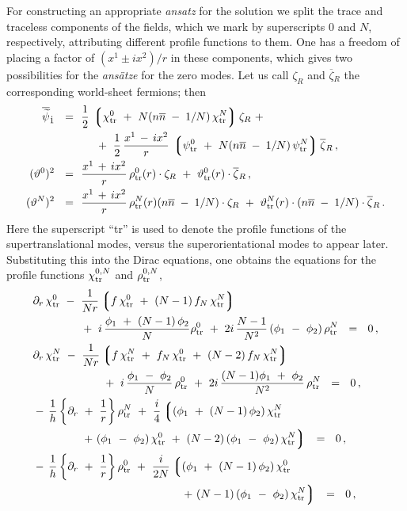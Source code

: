 \documentclass[12pt]{article}
\newcommand{\p}{\partial}
\newcommand{\wt}{\widetilde}
\newcommand{\ov}{\overline}
\newcommand{\lgr}{\left\lgroup}
\newcommand{\rgr}{\right\rgroup}
\newcommand{\bzr}{\ov{\zeta}{}_R}
\newcommand{\zr}{\zeta_R}
\newcommand{\nbar}{\ov{n}}
\newcommand{\pts}{\psi_{\rm tr}^0}
\newcommand{\ptN}{\psi_{\rm tr}^N}
\newcommand{\cts}{\chi_{\rm tr}^0}
\newcommand{\ctN}{\chi_{\rm tr}^N}
\newcommand{\tts}{\vartheta_{\rm tr}^0}
\newcommand{\ttN}{\vartheta_{\rm tr}^N}
\newcommand{\rts}{\rho_{\rm tr}^0}
\newcommand{\rtN}{\rho_{\rm tr}^N}
\begin{document}
For constructing an appropriate {\it ansatz} for the solution we split the trace and traceless components of the
fields, which we mark by superscripts $0$ and $N$, respectively, attributing different profile functions to them. 
One has a freedom of placing a factor of $ (x^1 \pm ix^2)/r $ in these components, which gives two possibilities
for the {\it ans\"atze} for the zero modes.
Let us call $ \zr $ and $ \bzr $ the corresponding world-sheet fermions; then 
\begin{align*}
%
	\ov{\wt{\psi}}{}_{\dot 1} ~~=~~ & \frac{1}{2}\, \lgr \cts ~+~ N (n\nbar \;-\; 1/N)\,\ctN \rgr \zr ~+~ \\
%
	& 
		\quad~+~
		\frac{1}{2}\, \frac{x^1 \,-\, ix^2}{r}\, \lgr \pts ~+~ N(n\nbar \;-\; 1/N)\, \ptN \rgr \bzr\,, \\
%
	(\vartheta^0)^2 ~~=~~ &
		\frac{x^1 \,+\, ix^2}{r}\, \rts(r)\cdot \zr 
		~+~ \tts(r)\cdot \bzr\,, \\
%
	(\vartheta^N)^2 ~~=~~ &
		\frac{x^1 \,+\, ix^2}{r}\,\rtN(r) (n\nbar \;-\; 1/N) \cdot \zr 
		~+~ \ttN(r)\cdot (n\nbar \;-\; 1/N) \cdot \bzr \,.
\end{align*}
Here the superscript ``tr'' is used to denote the profile functions of the supertranslational modes, versus the
superorientational modes to appear later.
Substituting this into the Dirac equations, one obtains the equations 
for the profile functions 
$ \chi_{\rm tr}^{0,N} $ and $ \rho_{\rm tr}^{0,N} $,
\begin{align*}
%
	&
	\p_r\, \cts ~-~ \frac{1}{Nr}\lgr f\,\cts ~+~ (N-1)\, f_N\, \ctN \rgr \\
	&
	\qquad\qquad
		~+~ i\, \frac{ \phi_1 ~+~ (N-1)\,\phi_2}{N} \rts 
		~+~ 2i\, \frac{N-1}{N^2}\, (\phi_1 ~-~ \phi_2)\, \rtN ~~=~~ 0\,,
\\
%
	&
	\p_r\, \ctN ~-~ \frac{1}{Nr} \lgr f\, \ctN ~+~ f_N\, \cts ~+~ (N-2)\,f_N\,\ctN \rgr \\
	& 
	\qquad\qquad\qquad
		~+~ i\, \frac{\phi_1 ~-~ \phi_2}{N}\, \rts 
		~+~ 2i\, \frac{(N-1)\phi_1 ~+~ \phi_2}{N^2}\, \rtN ~~=~~ 0\,,
\\
%
	&
	-\,\frac{1}{h} \left\{ \p_r ~+~ \frac{1}{r} \right\} \rtN 
		~+~ \frac{i}{4} \lgr (\phi_1 ~+~ (N-1)\,\phi_2)\,\ctN \right. \\
	&
	\qquad\qquad
		\left.
		~+~ (\phi_1~-~\phi_2)\,\cts ~+~ (N-2)\,(\phi_1~-~\phi_2)\,\ctN \rgr ~~=~~ 0\,,
\\
%
	&
	-\,\frac{1}{h} \left\{ \p_r ~+~ \frac{1}{r} \right\} \rts 
		~+~ \frac{i}{2N} \lgr (\phi_1 ~+~ (N-1)\,\phi_2)\,\cts \right. \\
	&
	\qquad\qquad\qquad\qquad\qquad\qquad\quad
		\left.
		~+~ (N-1)\,(\phi_1~-~\phi_2)\,\ctN \rgr ~~=~~0\,,
\end{align*}
\end{document}
